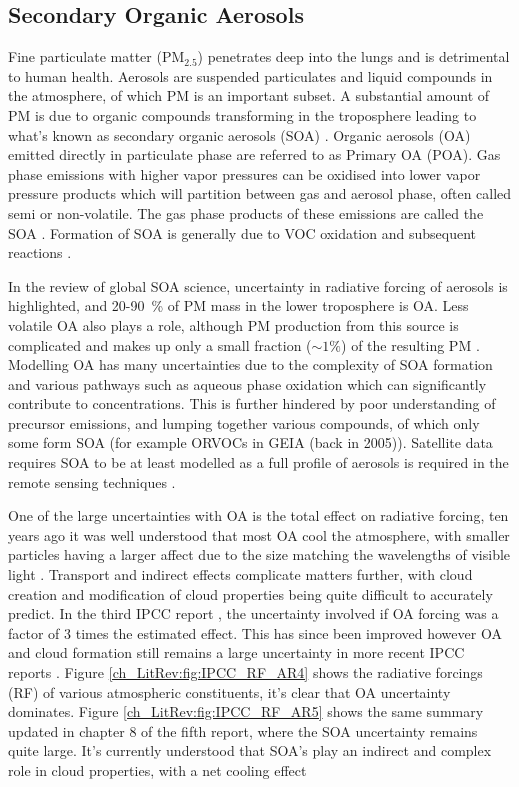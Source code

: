   \subsection{Secondary Organic Aerosols}
    Fine particulate matter (PM$_{2.5}$) penetrates deep into the lungs and is detrimental to human health.
    Aerosols are suspended particulates and liquid compounds in the atmosphere, of which PM is an important subset.
    A substantial amount of PM is due to organic compounds transforming in the troposphere leading to what's known as secondary organic aerosols (SOA) \citep{Kroll2008}.
    Organic aerosols (OA) emitted directly in particulate phase are referred to as Primary OA (POA).
    Gas phase emissions with higher vapor pressures can be oxidised into lower vapor pressure products which will partition between gas and aerosol phase, often called semi or non-volatile. 
    The gas phase products of these emissions are called the SOA \citep{Kanakidou2005}.
    Formation of SOA is generally due to VOC oxidation and subsequent reactions \citep{Kanakidou2005}.
    
    In the \cite{Kanakidou2005} review of global SOA science, uncertainty in radiative forcing of aerosols is highlighted, and 20-90~\% of PM mass in the lower troposphere is OA.
    Less volatile OA also plays a role, although PM production from this source is complicated and makes up only a small fraction ($\sim 1 \%$) of the resulting PM \citep{Kroll2008,Bei2012}.
    Modelling OA has many uncertainties due to the complexity of SOA formation and various pathways such as aqueous phase oxidation which can significantly contribute to concentrations.
    This is further hindered by poor understanding of precursor emissions, and lumping together various compounds, of which only some form SOA (for example ORVOCs in GEIA (back in 2005)).
    Satellite data requires SOA to be at least modelled as a full profile of aerosols is required in the remote sensing techniques \citep{Kanakidou2005}.
    
    One of the large uncertainties with OA is the total effect on radiative forcing, ten years ago it was well understood that most OA cool the atmosphere, with smaller particles having a larger affect due to the size matching the wavelengths of visible light \citep{Kanakidou2005}. 
    Transport and indirect effects complicate matters further, with cloud creation and modification of cloud properties being quite difficult to accurately predict.
    In the third IPCC report \citep{IPCC2001}, the uncertainty involved if OA forcing was a factor of 3 times the estimated effect. 
    This has since been improved however OA and cloud formation still remains a large uncertainty in more recent IPCC reports \citep{IPCC_Chapter2}.
    Figure \ref{ch_LitRev:fig:IPCC_RF_AR4} shows the radiative forcings (RF) of various atmospheric constituents, it's clear that OA uncertainty dominates.
    Figure \ref{ch_LitRev:fig:IPCC_RF_AR5} shows the same summary updated in chapter 8 of the fifth report, where the SOA uncertainty remains quite large.
    It's currently understood that SOA's play an indirect and complex role in cloud properties, with a net cooling effect \citep[Chapter 7,8]{IPCC_AR5_WG1}
    
